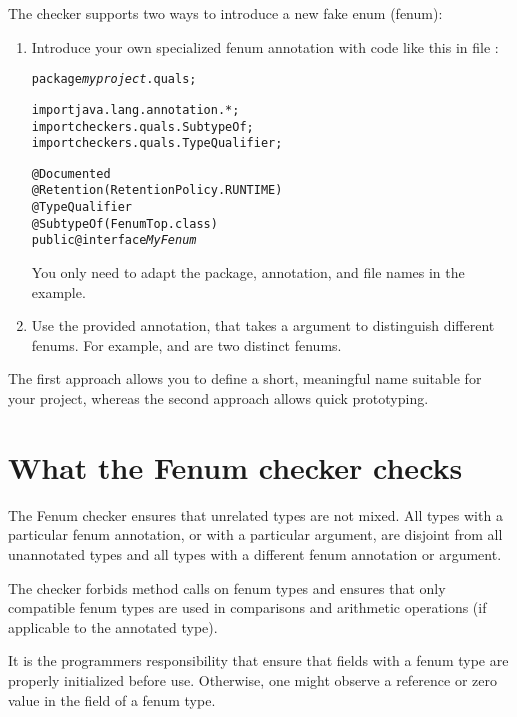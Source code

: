 The checker supports two ways to introduce a new fake enum (fenum):

\begin{enumerate}
\item Introduce your own specialized fenum annotation with code like this in
file :

\begin{alltt}
package \textit{myproject}.quals;

import java.lang.annotation.*;
import checkers.quals.SubtypeOf;
import checkers.quals.TypeQualifier;

@Documented
@Retention(RetentionPolicy.RUNTIME)
@TypeQualifier
@SubtypeOf( \ttlcb{} FenumTop.class \ttrcb{} )
public @interface \textit{MyFenum} \ttlcb\ttrcb
\end{alltt}

You only need to adapt the package, annotation, and file names in the example.


\item Use the provided  annotation, that takes a
 argument to distinguish different fenums.
For example,  and  are two distinct fenums.
\end{enumerate}


The first approach allows you to define a short, meaningful name suitable for
your project, whereas the second approach allows quick prototyping.



\section{What the Fenum checker checks\label{fenum-checks}}

The Fenum checker ensures that unrelated types are not mixed. 
All types with a particular fenum annotation, or  with a particular  argument, are
disjoint from all unannotated types and all types with a different fenum
annotation or  argument.

The checker forbids method calls on fenum types and ensures that
only compatible fenum types are used in comparisons and arithmetic operations
(if applicable to the annotated type).

It is the programmers responsibility that ensure that fields with a fenum type
are properly initialized before use. Otherwise, one might observe a 
reference or zero value in the field of a fenum type.



